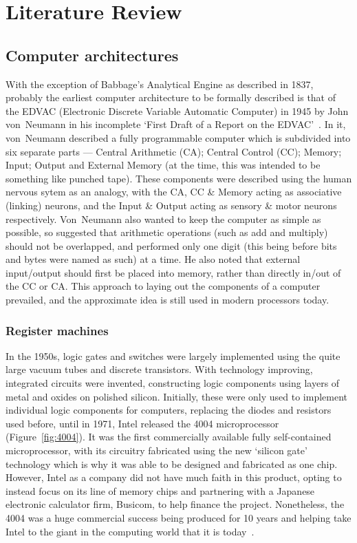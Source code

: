 \chapter{Literature Review}\label{ch:litreview}
\section{Computer architectures}
With the exception of Babbage's Analytical Engine as described in 1837, probably
the earliest computer architecture to be formally described is that of the EDVAC
(Electronic Discrete Variable Automatic Computer) in 1945 by John von~Neumann in
his incomplete `First Draft of a Report on the EDVAC'~\cite{FirstDraft}. In it,
von~Neumann described a fully programmable computer which is subdivided into six
separate parts --- Central Arithmetic (CA); Central Control (CC); Memory; Input;
Output and External Memory (at the time, this was intended to be something like
punched tape). These components were described using the human nervous sytem as
an analogy, with the CA, CC \& Memory acting as associative (linking) neurons,
and the Input \& Output acting as sensory \& motor neurons respectively.
Von~Neumann also wanted to keep the computer as simple as possible, so suggested
that arithmetic operations (such as add and multiply) should not be overlapped,
and performed only one digit (this being before bits and bytes were named as
such) at a time. He also noted that external input/output should first be placed
into memory, rather than directly in/out of the CC or CA\@. This approach to
laying out the components of a computer prevailed, and the approximate idea is
still used in modern processors today.

\subsection{Register machines}

In the 1950s, logic gates and switches were largely implemented using the quite
large vacuum tubes and discrete transistors. With technology improving,
integrated circuits were invented, constructing logic components using layers of
metal and oxides on polished silicon. Initially, these were only used to
implement individual logic components for computers, replacing the diodes and
resistors used before, until in 1971, Intel released the 4004 microprocessor
(Figure~\ref{fig:4004}). It was the first commercially available fully
self-contained microprocessor, with its circuitry fabricated using the new
`silicon gate' technology which is why it was able to be designed and fabricated
as one chip. However, Intel as a company did not have much faith in this
product, opting to instead focus on its line of memory chips and partnering with
a Japanese electronic calculator firm, Busicom, to help finance the project.
Nonetheless, the 4004 was a huge commercial success being produced for 10 years
and helping take Intel to the giant in the computing world that it is
today~\cite{Aspray1997Intel}.

